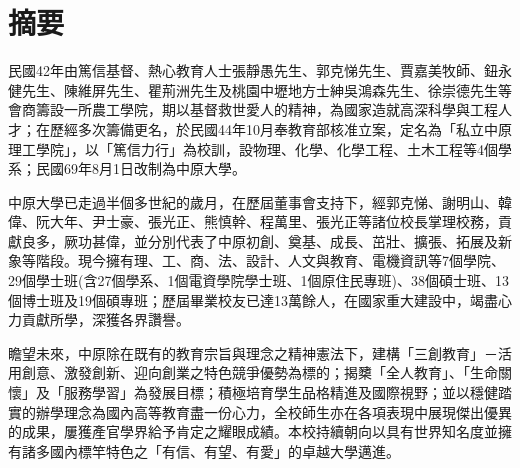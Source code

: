 \section*{摘要}

民國42年由篤信基督、熱心教育人士張靜愚先生、郭克悌先生、賈嘉美牧師、鈕永健先生、陳維屏先生、瞿荊洲先生及桃園中壢地方士紳吳鴻森先生、徐崇德先生等會商籌設一所農工學院，期以基督救世愛人的精神，為國家造就高深科學與工程人才；在歷經多次籌備更名，於民國44年10月奉教育部核准立案，定名為「私立中原理工學院」，以「篤信力行」為校訓，設物理、化學、化學工程、土木工程等4個學系；民國69年8月1日改制為中原大學。
\par
中原大學已走過半個多世紀的歲月，在歷屆董事會支持下，經郭克悌、謝明山、韓偉、阮大年、尹士豪、張光正、熊慎幹、程萬里、張光正等諸位校長掌理校務，貢獻良多，厥功甚偉，並分別代表了中原初創、奠基、成長、茁壯、擴張、拓展及新象等階段。現今擁有理、工、商、法、設計、人文與教育、電機資訊等7個學院、29個學士班(含27個學系、1個電資學院學士班、1個原住民專班)、38個碩士班、13個博士班及19個碩專班；歷屆畢業校友已達13萬餘人，在國家重大建設中，竭盡心力貢獻所學，深獲各界讚譽。 
\par
瞻望未來，中原除在既有的教育宗旨與理念之精神憲法下，建構「三創教育」－活用創意、激發創新、迎向創業之特色競爭優勢為標的；揭櫫「全人教育」、「生命關懷」及「服務學習」為發展目標；積極培育學生品格精進及國際視野；並以穩健踏實的辦學理念為國內高等教育盡一份心力，全校師生亦在各項表現中展現傑出優異的成果，屢獲產官學界給予肯定之耀眼成績。本校持續朝向以具有世界知名度並擁有諸多國內標竿特色之「有信、有望、有愛」的卓越大學邁進。
\clearpage